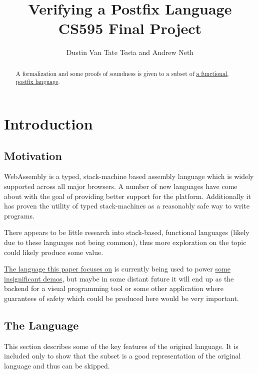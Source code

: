 \documentclass{article}
\title{Verifying a Postfix Language \\
    \large CS595 Final Project}
\author{Dustin Van Tate Testa and Andrew Neth}
\begin{document}
\maketitle
\begin{abstract}
A formalization and some proofs of soundness is given to a subset of \href{https://github.com/dvtate/postfix-haskell}{a functional, postfix language}.
\end{abstract}

\section{Introduction}
\subsection{Motivation}
WebAssembly is a typed, stack-machine based assembly language which is widely supported across all major browsers. A number of new languages have come about with the goal of providing better support for the platform. Additionally it has proven the utility of typed stack-machines as a reasonably safe way to write programs.

There appears to be little research into stack-based, functional languages (likely due to these languages not being common), thus more exploration on the topic could likely produce some value.

\href{https://github.com/dvtate/postfix-haskell}{The language this paper focuses on} is currently being used to power \href{https://ridder.xyz/game}{some insignificant demos}, but maybe in some distant future it will end up as the backend for a visual programming tool or some other application where guarantees of safety which could be produced here would be very important.

\subsection{The Language}
This section describes some of the key features of the original language. It is included only to show that the subset is a good representation of the original language and thus can be skipped.
\end{document}
